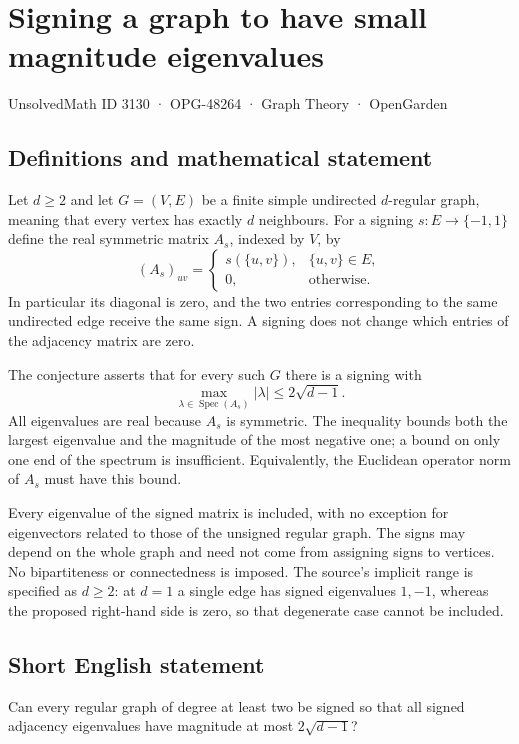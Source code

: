 \documentclass[11pt,a4paper]{article}
\begin{document}
\section*{Signing a graph to have small magnitude eigenvalues}\label{3130}
{\small UnsolvedMath ID 3130 · OPG-48264 · Graph Theory · OpenGarden}
\subsection{Definitions and mathematical statement}
Let $d\ge2$ and let $G=(V,E)$ be a finite simple undirected $d$-regular
graph, meaning that every vertex has exactly $d$ neighbours.
For a signing $s:E\to\{-1,1\}$ define the real symmetric matrix
$A_s$, indexed by $V$, by
\[
 (A_s)_{uv}=\begin{cases}s(\{u,v\}),&\{u,v\}\in E,\\
                         0,&\text{otherwise}.\end{cases}
\]
In particular its diagonal is zero, and the two entries corresponding
to the same undirected edge receive the same sign. A signing does not
change which entries of the adjacency matrix are zero.

The conjecture asserts that for every such $G$ there is a signing with
\[
 \max_{\lambda\in\operatorname{Spec}(A_s)}|\lambda|
                 \le2\sqrt{d-1}.
\]
All eigenvalues are real because $A_s$ is symmetric. The inequality
bounds both the largest eigenvalue and the magnitude of the most
negative one; a bound on only one end of the spectrum is insufficient.
Equivalently, the Euclidean operator norm of $A_s$ must have this bound.

Every eigenvalue of the signed matrix is included, with no exception
for eigenvectors related to those of the unsigned regular graph.
The signs may depend on the whole graph and need not come from
assigning signs to vertices. No bipartiteness or connectedness is imposed.
The source's implicit range is specified as $d\ge2$: at $d=1$ a single
edge has signed eigenvalues $1,-1$, whereas the proposed right-hand
side is zero, so that degenerate case cannot be included.
\subsection{Short English statement}
Can every regular graph of degree at least two be signed so that all signed adjacency eigenvalues have magnitude at most $2\sqrt{d-1}$?
\end{document}
